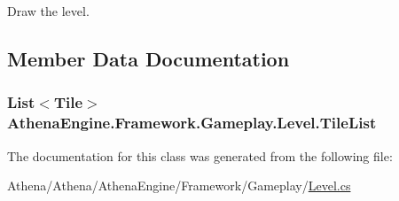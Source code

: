 Draw the level. 



\subsection{Member Data Documentation}
\hypertarget{class_athena_engine_1_1_framework_1_1_gameplay_1_1_level_a6773a6b354bc2037f1a9c27c2035e7de}{
\subsubsection[{Tile\-List}]{\setlength{\rightskip}{0pt plus 5cm}List$<${\bf Tile}$>$ Athena\-Engine.\-Framework.\-Gameplay.\-Level.\-Tile\-List}}\label{class_athena_engine_1_1_framework_1_1_gameplay_1_1_level_a6773a6b354bc2037f1a9c27c2035e7de}


The documentation for this class was generated from the following file\-:\begin{DoxyCompactItemize}
\item 
Athena/\-Athena/\-Athena\-Engine/\-Framework/\-Gameplay/\hyperlink{_level_8cs}{Level.\-cs}\end{DoxyCompactItemize}
